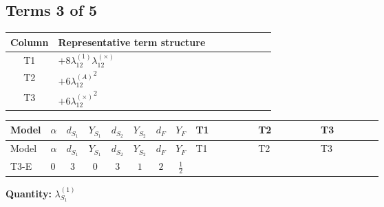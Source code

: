 \documentclass[8pt]{article}
\begin{document}
\begin{landscape}
\subsection*{Terms 3 of 5}
\begin{center}
\begin{tabular}{@{}c >{\raggedright\arraybackslash}p{0.82\linewidth}@{}}
\toprule
Column & Representative term structure \\
\midrule
T1 & \(\displaystyle +8 {\lambda_{12}^{(1)}} {\lambda_{12}^{(\times)}}\) \\
\midrule
T2 & \(\displaystyle +6 {\lambda_{12}^{(A)}}^2\) \\
\midrule
T3 & \(\displaystyle +6 {\lambda_{12}^{(\times)}}^2\) \\
\midrule
\bottomrule
\end{tabular}
\end{center}
\smallskip
\tiny
\begin{longtable}{@{}llcccccc >{\raggedright\arraybackslash}p{0.21\linewidth} >{\raggedright\arraybackslash}p{0.21\linewidth} >{\raggedright\arraybackslash}p{0.21\linewidth}@{}}
\toprule
Model & $\alpha$ & $d_{S_1}$ & $Y_{S_1}$ & $d_{S_2}$ & $Y_{S_2}$ & $d_F$ & $Y_F$ & T1 & T2 & T3 \\
\midrule
\endfirsthead
\toprule
Model & $\alpha$ & $d_{S_1}$ & $Y_{S_1}$ & $d_{S_2}$ & $Y_{S_2}$ & $d_F$ & $Y_F$ & T1 & T2 & T3 \\
\midrule
\endhead
T3-E & $0$ & $3$ & $0$ & $3$ & $1$ & $2$ & $\frac{1}{2}$ & \scriptsize\adjustbox{max width=\linewidth}{$\begin{gathered} +8 {\lambda_{12}^{(1)}} {\lambda_{12}^{(\times)}}\end{gathered}$} & \scriptsize\adjustbox{max width=\linewidth}{$\begin{gathered} +6 {\lambda_{12}^{(A)}}^2\end{gathered}$} & \scriptsize\adjustbox{max width=\linewidth}{$\begin{gathered} +6 {\lambda_{12}^{(\times)}}^2\end{gathered}$} \\
\midrule
\bottomrule
\end{longtable}
\clearpage
\noindent\textbf{Quantity: }$\lambda_{S_1}^{(1)}$\par\smallskip

\end{landscape}
\end{document}

